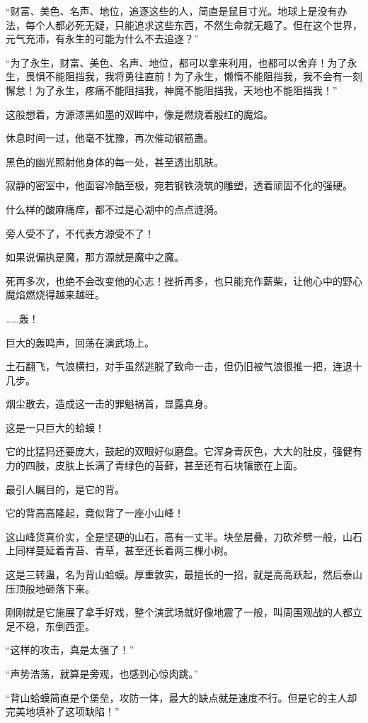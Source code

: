 \begin{this_body}
“财富、美色、名声、地位，追逐这些的人，简直是鼠目寸光。地球上是没有办法，每个人都必死无疑，只能追求这些东西，不然生命就无趣了。但在这个世界，元气充沛，有永生的可能为什么不去追逐？”

“为了永生，财富、美色、名声、地位，都可以拿来利用，也都可以舍弃！为了永生，畏惧不能阻挡我，我将勇往直前！为了永生，懒惰不能阻挡我，我不会有一刻懈怠！为了永生，疼痛不能阻挡我，神魔不能阻挡我，天地也不能阻挡我！”

这般想着，方源漆黑如墨的双眸中，像是燃烧着殷红的魔焰。

休息时间一过，他毫不犹豫，再次催动钢筋蛊。

黑色的幽光照射他身体的每一处，甚至透出肌肤。

寂静的密室中，他面容冷酷至极，宛若钢铁浇筑的雕塑，透着顽固不化的强硬。

什么样的酸麻痛痒，都不过是心湖中的点点涟漪。

旁人受不了，不代表方源受不了！

如果说偏执是魔，那方源就是魔中之魔。

死再多次，也绝不会改变他的心志！挫折再多，也只能充作薪柴，让他心中的野心魔焰燃烧得越来越旺。

……轰！

巨大的轰鸣声，回荡在演武场上。

土石翻飞，气浪横扫，对手虽然逃脱了致命一击，但仍旧被气浪很推一把，连退十几步。

烟尘散去，造成这一击的罪魁祸首，显露真身。

这是一只巨大的蛤蟆！

它的比猛犸还要庞大，鼓起的双眼好似磨盘。它浑身青灰色，大大的肚皮，强健有力的四肢，皮肤上长满了青绿色的苔藓，甚至还有石块镶嵌在上面。

最引人瞩目的，是它的背。

它的背高高隆起，竟似背了一座小山峰！

这山峰货真价实，全是坚硬的山石，高有一丈半。块垒层叠，刀砍斧劈一般，山石上同样蔓延着青苔、青草，甚至还长着两三棵小树。

这是三转蛊，名为背山蛤蟆。厚重敦实，最擅长的一招，就是高高跃起，然后泰山压顶般地砸落下来。

刚刚就是它施展了拿手好戏，整个演武场就好像地震了一般，叫周围观战的人都立足不稳，东倒西歪。

“这样的攻击，真是太强了！”

“声势浩荡，就算是旁观，也感到心惊肉跳。”

“背山蛤蟆简直是个堡垒，攻防一体，最大的缺点就是速度不行。但是它的主人却完美地填补了这项缺陷！”


\end{this_body}
